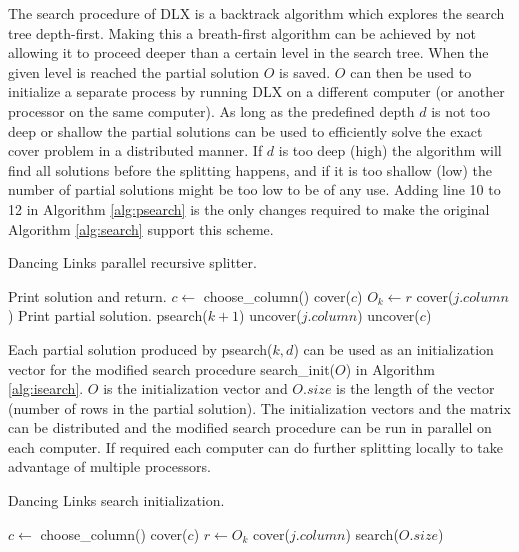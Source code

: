 The search procedure of DLX is a backtrack algorithm which explores the search tree depth-first.
Making this a breath-first algorithm can be achieved by not allowing it to proceed deeper than a certain level in the search tree.
When the given level is reached the partial solution $O$ is saved.
$O$ can then be used to initialize a separate process by running DLX on a different computer (or another processor on the same computer).
As long as the predefined depth $d$ is not too deep or shallow the partial solutions can be used to efficiently solve the exact cover problem in a distributed manner.
If $d$ is too deep (high) the algorithm will find all solutions before the splitting happens, and if it is too shallow (low) the number of partial solutions might be too low to be of any use.
Adding line 10 to 12 in Algorithm \ref{alg:psearch} is the only changes required to make the original Algorithm \ref{alg:search} support this scheme.
\begin{algorithm}[p]
	\caption{Dancing Links parallel recursive splitter.}
	\label{alg:psearch}
	\begin{distribalgo}[1]
				\STATE Print solution and return.  
			\ENDIF
			\STATE $c \leftarrow$ choose\_column()
			\STATE cover($c$)
				\STATE $O_k \leftarrow r$  
					\STATE cover($j.column$)
				\ENDFOR
					\STATE Print partial solution.  
				\ELSE
					\STATE psearch($k + 1$)
				\ENDIF
					\STATE uncover($j.column$)
				\ENDFOR
			\ENDFOR
			\STATE uncover($c$)
		\ENDPROC
	\end{distribalgo}
\end{algorithm}

Each partial solution produced by psearch($k, d$) can be used as an initialization vector for the modified search procedure search\_init($O$) in Algorithm \ref{alg:isearch}.
$O$ is the initialization vector and $O.size$ is the length of the vector (number of rows in the partial solution).
The initialization vectors and the matrix can be distributed and the modified search procedure can be run in parallel on each computer.
If required each computer can do further splitting locally to take advantage of multiple processors.
\begin{algorithm}[p]
	\caption{Dancing Links search initialization.}
	\label{alg:isearch}
	\begin{distribalgo}[1]
				\STATE $c \leftarrow$ choose\_column()
				\STATE cover($c$)
				\STATE $r \leftarrow O_k$
					\STATE cover($j.column$)
				\ENDFOR
			\ENDFOR
			\STATE search($O.size$)  
		\ENDPROC
	\end{distribalgo}
\end{algorithm}

